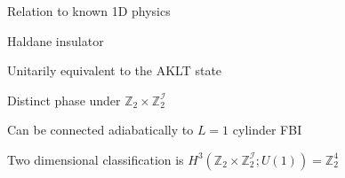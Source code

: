 \begin{block}{Relation to known 1D physics}
\bi 
\item Haldane insulator
\bi
\item Unitarily equivalent to the AKLT state 
\item Distinct phase under $\mathbb{Z}_2 \times \mathbb{Z}_2^{\mathcal{I}}$
\item Can be connected adiabatically to $L=1$ cylinder FBI
\ei

\item Two dimensional classification is $H^3(\mathbb{Z}_2 \times \mathbb{Z}_2^{\mathcal{I}}; U(1)) = \mathbb{Z}_2^4$

\ei 
\end{block}